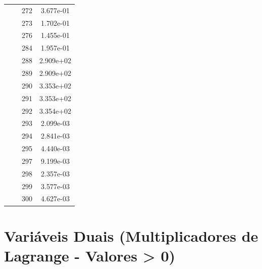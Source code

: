 \documentclass[12pt]{article}
\begin{document}
\begin{longtable}{@{}cccc@{}}
 &  & 272 & 3.677e-01 \\
 &  & 273 & 1.702e-01 \\
 &  & 276 & 1.455e-01 \\
 &  & 284 & 1.957e-01 \\
 &  & 288 & 2.909e+02 \\
 &  & 289 & 2.909e+02 \\
 &  & 290 & 3.353e+02 \\
 &  & 291 & 3.353e+02 \\
 &  & 292 & 3.354e+02 \\
 &  & 293 & 2.099e-03 \\
 &  & 294 & 2.841e-03 \\
 &  & 295 & 4.440e-03 \\
 &  & 297 & 9.199e-03 \\
 &  & 298 & 2.357e-03 \\
 &  & 299 & 3.577e-03 \\
 &  & 300 & 4.627e-03 \\

\bottomrule
\end{longtable}


\section{Variáveis Duais (Multiplicadores de Lagrange - Valores > 0)}
\end{document}
